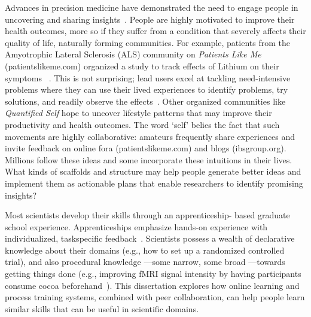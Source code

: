 Advances in precision medicine have demonstrated the need
to engage people in uncovering and sharing insights~\cite{Aronson2015}. People
are highly motivated to improve their health outcomes,
more so if they suffer from a condition that severely affects
their quality of life, naturally forming communities. For example,
patients from the Amyotrophic Lateral Sclerosis
(ALS) community on \textit{Patients Like Me} (patientslikeme.com)
organized a study to track effects of Lithium on their symptoms
~\cite{Wicks2011}. This is not surprising; lead users excel at tackling
need-intensive problems where they can use their lived
experiences to identify problems, try solutions, and readily
observe the effects~\cite{VonHippel2005}. Other organized communities like
\textit{Quantified Self} hope to uncover lifestyle patterns that may
improve their productivity and health outcomes. The word
‘self’ belies the fact that such movements are highly collaborative:
amateurs frequently share experiences and invite
feedback on online fora (patientslikeme.com) and blogs
(ibsgroup.org). Millions follow these ideas and some incorporate
these intuitions in their lives. What kinds of scaffolds
and structure may help people generate better ideas and implement them as actionable plans that
enable researchers to identify promising insights?


Most scientists develop their skills through an apprenticeship-
based graduate school experience. Apprenticeships emphasize
hands-on experience with individualized, taskspecific
feedback~\cite{schon1984reflective}. Scientists possess a wealth of declarative
knowledge about their domains (e.g., how to set up a
randomized controlled trial), and also procedural knowledge
—some narrow, some broad —towards getting things done
(e.g., improving fMRI signal intensity by having participants
consume cocoa beforehand~\cite{Francis2006}). This dissertation explores how
online learning and process training systems, combined with
peer collaboration, can help people learn similar skills that
can be useful in scientific domains.

